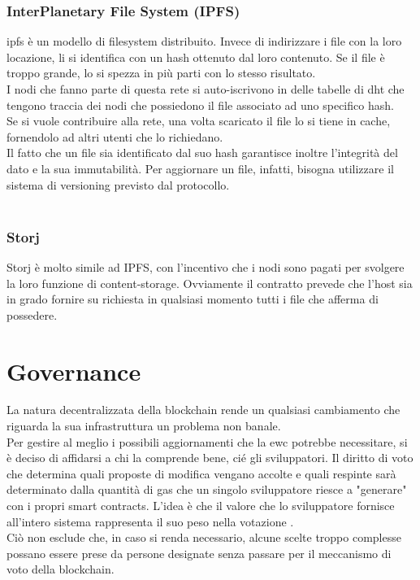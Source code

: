 \subsubsection{InterPlanetary File System (IPFS)}
\gls{ipfs} \cite{prod:ipfs} è un modello di filesystem distribuito.
Invece di indirizzare i file con la loro locazione, li si identifica con un hash ottenuto dal loro contenuto.
Se il file è troppo grande, lo si spezza in più parti con lo stesso risultato. \\
I nodi che fanno parte di questa rete si auto-iscrivono in delle tabelle di \gls{dht} che tengono traccia dei nodi che possiedono il file associato ad uno specifico hash. \\
Se si vuole contribuire alla rete, una volta scaricato il file lo si tiene in cache, fornendolo ad altri utenti che lo richiedano. \\
Il fatto che un file sia identificato dal suo hash garantisce inoltre l'integrità del dato e la sua immutabilità.
Per aggiornare un file, infatti, bisogna utilizzare il sistema di versioning previsto dal protocollo. \\ \\

\subsubsection{Storj}
Storj \cite{prod:storj} è molto simile ad IPFS, con l'incentivo che i nodi sono pagati per svolgere la loro funzione di content-storage.
Ovviamente il contratto prevede che l'host sia in grado fornire su richiesta in qualsiasi momento tutti i file che afferma di possedere.


\section{Governance}
La natura decentralizzata della blockchain rende un qualsiasi cambiamento che riguarda la sua infrastruttura un problema non banale. \\
Per gestire al meglio i possibili aggiornamenti che la \gls{ewc} potrebbe necessitare, si è deciso di affidarsi a chi la comprende bene, cié gli sviluppatori.
Il diritto di voto che determina quali proposte di modifica vengano accolte e quali respinte sarà determinato dalla quantità di gas che un singolo sviluppatore riesce a "generare" con i propri smart contracts.
L'idea è che il valore che lo sviluppatore fornisce all'intero sistema rappresenta il suo peso nella votazione \cite{wiki:ew-governance}. \\
Ciò non esclude che, in caso si renda necessario, alcune scelte troppo complesse possano essere prese da persone designate senza passare per il meccanismo di voto della blockchain.

